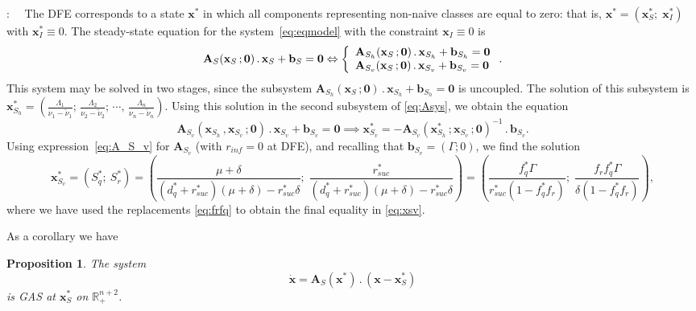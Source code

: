 \documentclass[a4paper]{article}
\newcommand{\varphiVar}{r_{inf}}
\newcommand{\varpiVar}{r_{suc}}
\newcommand{\hatmuVar}{d_q}
\newtheorem{prop}{Proposition}[section]
\begin{document}
:~~
The DFE corresponds to  a state $\mathbf x^*$ in which all components representing non-naive classes are equal to zero: that is, $\mathbf x^* = \left(\mathbf x^*_S;\;\mathbf x^*_I\right)$ with $\mathbf x^*_I\equiv 0$. The steady-state equation for the system~\eqref{eq:eqmodel} with the constraint $\mathbf x_I\equiv0$ is  
\begin{equation}\label{eq:Asys}
\mathbf
A_S(\mathbf x_S\,;\mathbf 0)\,.\,\mathbf x_S  +  \mathbf b_S=\mathbf 0\Leftrightarrow \left\{\begin{array}{l}
\mathbf A_{S_h}(\mathbf x_S\,;\mathbf 0)\,.\,\mathbf x_{S_h}  +  \mathbf b_{S_h}=\mathbf 0\cr \mathbf A_{S_v}(\mathbf x_S\,;\mathbf 0)\,.\,\mathbf x_{S_v}  +  \mathbf b_{S_v}=\mathbf 0
\end{array}\right. .
\end{equation} 
This system may be solved in two stages, since the subsystem $\mathbf A_{S_h}(\mathbf x_S\,;\mathbf 0)\,.\,\mathbf x_{S_h}  +  \mathbf b_{S_h}=\mathbf 0$ is uncoupled. The solution of this subsystem is $\mathbf x^*_{S_h} = \left(\frac{\Lambda_1}{ \nu_1-\widetilde\nu_1};\,\frac{\Lambda_2}{ \nu_2-\widetilde\nu_2};\,\cdots,\,\frac{\Lambda_n}{\nu_n-\widetilde \nu_n}\right)$. Using this solution in the second subsystem of \eqref{eq:Asys}, we obtain the equation 
$$\mathbf A_{S_v}(\mathbf x_{S_h}\,,\mathbf x_{S_v}\,;\mathbf 0)\,.\,\mathbf x_{S_v}  +  \mathbf b_{S_v}=\mathbf 0
\implies
\mathbf x^*_{S_v}=-{\mathbf A_{S_v}(\mathbf x^*_{S_h}\,;\mathbf x_{S_v}\,;\mathbf 0)}^{-1}\,.\, \mathbf b_{S_v}.$$
Using expression~\eqref{eq:A_S_v} for $\mathbf A_{S_v}$ (with $\varphiVar =0$ at DFE), and recalling that $\mathbf b_{S_v} = (\Gamma ; 0)$, we find the solution
\begin{equation}\label{eq:xsv}
\mathbf x^*_{S_v} = (S_q^*;~S_r^*)= \left(\dfrac{\mu + \delta}{(\hatmuVar^* +\varpiVar^* )(\mu + \delta) - \varpiVar^*  \delta};\;\dfrac{\varpiVar^* }{(\hatmuVar^* +\varpiVar^* )(\mu + \delta) - \varpiVar^*  \delta}\right) = \left(\dfrac{f^*_q\Gamma}{\varpiVar ^*(1-f^*_qf_r)};\;\dfrac{f_rf^*_q\Gamma}{\delta(1-f^*_qf_r)}\right),
\end{equation}
where we have used the replacements \eqref{eq:frfq} to obtain the final equality in \eqref{eq:xsv}.


\noindent As a corollary we have

\begin{prop}\label{prop:stbsysred} The system \begin{equation}\label{eq.sysred}
\dot{\mathbf x} = \mathbf A_S(\mathbf x^*)\,.\,\left(\mathbf x-\mathbf x^*_S\right)
\end{equation}
 is GAS at $\mathbf x^*_S$ on $\mathbb R_+^{n+2}$.\end{prop}
\end{document}
